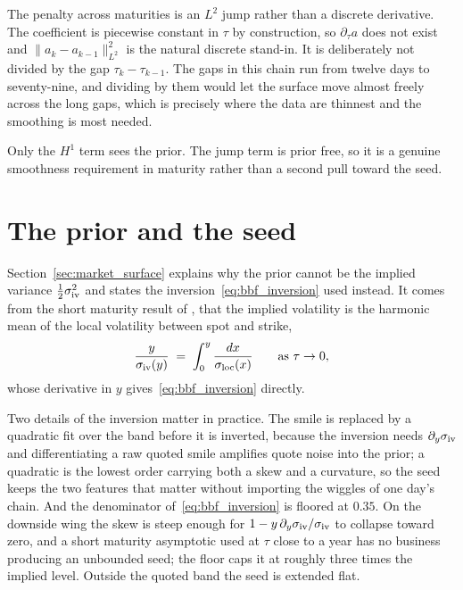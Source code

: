 The penalty across maturities is an $L^2$ jump rather than a discrete derivative. The
coefficient is piecewise constant in $\tau$ by construction, so $\partial_\tau a$ does not
exist and $\|a_k - a_{k-1}\|^2_{L^2}$ is the natural discrete stand-in. It is deliberately not
divided by the gap $\tau_k - \tau_{k-1}$. The gaps in this chain run from twelve days to
seventy-nine, and dividing by them would let the surface move almost freely across the long
gaps, which is precisely where the data are thinnest and the smoothing is most needed.

Only the $H^1$ term sees the prior. The jump term is prior free, so it is a genuine smoothness
requirement in maturity rather than a second pull toward the seed.

\section{The prior and the seed}
\label{subsec:prior_details}

Section~\ref{sec:market_surface} explains why the prior cannot be the implied variance
$\tfrac12\sigma_{\mathrm{iv}}^2$ and states the inversion~\eqref{eq:bbf_inversion} used
instead. It comes from the short maturity result of \cite{berestycki_busca_florent}, that the
implied volatility is the harmonic mean of the local volatility between spot and strike,
\begin{equation}\label{eq:bbf_harmonic}
    \frac{y}{\sigma_{\mathrm{iv}}(y)}
        \;=\; \int_0^y \frac{dx}{\sigma_{\mathrm{loc}}(x)}
    \qquad \text{as } \tau \to 0,
\end{equation}
whose derivative in $y$ gives~\eqref{eq:bbf_inversion} directly.

Two details of the inversion matter in practice. The smile is replaced by a quadratic fit over
the band before it is inverted, because the inversion needs
$\partial_y\sigma_{\mathrm{iv}}$ and differentiating a raw quoted smile amplifies quote noise
into the prior; a quadratic is the lowest order carrying both a skew and a curvature, so the
seed keeps the two features that matter without importing the wiggles of one day's chain. And
the denominator of~\eqref{eq:bbf_inversion} is floored at $0.35$. On the downside wing the
skew is steep enough for $1 - y\,\partial_y\sigma_{\mathrm{iv}}/\sigma_{\mathrm{iv}}$ to
collapse toward zero, and a short maturity asymptotic used at $\tau$ close to a year has no
business producing an unbounded seed; the floor caps it at roughly three times the implied
level. Outside the quoted band the seed is extended flat.

